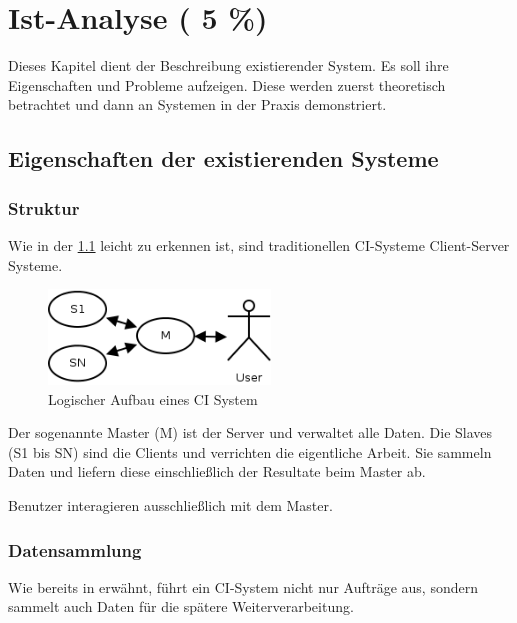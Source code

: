 \chapter{Ist-Analyse ( 5 \%)}
\label{chap:ist-analyse}

Dieses Kapitel dient der Beschreibung existierender System.
Es soll ihre Eigenschaften und Probleme aufzeigen.
Diese werden zuerst theoretisch betrachtet und
dann an Systemen in der Praxis demonstriert.


\section{Eigenschaften der existierenden Systeme}

\subsection{Struktur}
\label{sec:ist-analyse:struktur}

Wie in der \cref{fig:ist-aufbau-tradition} leicht zu erkennen ist,
sind traditionellen \ac{CI}-Systeme Client-Server Systeme.

\begin{figure}[ht]
  \centering
  \includegraphics[height=1in]{imageinput/ist-aufbau-tradition.png}
  \caption{Logischer Aufbau eines CI System}
  \label{fig:ist-aufbau-tradition}
\end{figure}

Der sogenannte Master (M) ist der Server und verwaltet alle Daten.
Die Slaves (S1 bis SN) sind die Clients und verrichten die eigentliche Arbeit.
Sie sammeln Daten und liefern diese einschließlich der Resultate beim Master ab.

Benutzer interagieren ausschließlich mit dem Master.

\subsection{Datensammlung}
Wie bereits in  erwähnt,
führt ein \ac{CI}-System nicht nur Aufträge aus,
sondern sammelt auch Daten für die spätere Weiterverarbeitung.

